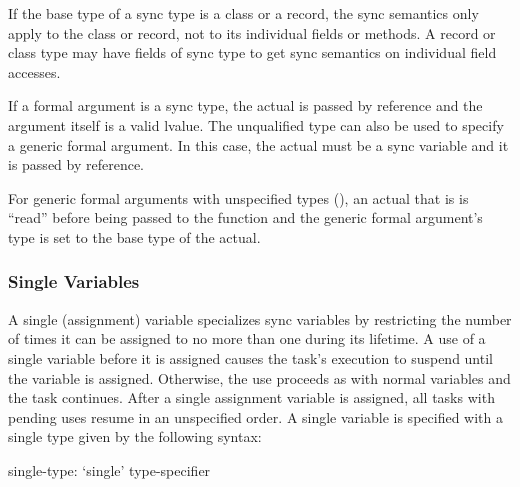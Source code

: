 If the base type of a sync type is a class or a record, the sync
semantics only apply to the class or record, not to its individual
fields or methods.  A record or class type may have fields of sync
type to get sync semantics on individual field accesses.

If a formal argument is a sync type, the actual is passed by reference
and the argument itself is a valid lvalue.  The unqualified
type  can also be used to specify a generic formal
argument.  In this case, the actual must be a sync variable and it is
passed by reference.

For generic formal arguments with unspecified types
(), an actual that
is  is ``read'' before being passed to the function and the
generic formal argument's type is set to the base type of the actual.

\subsubsection{Single Variables}
\label{Single_Variables}

A single (assignment) variable specializes sync variables by
restricting the number of times it can be assigned to no more than one
during its lifetime.  A use of a single variable before it is assigned
causes the task's execution to suspend until the variable is assigned.
Otherwise, the use proceeds as with normal variables and the task
continues.  After a single assignment variable is assigned, all tasks
with pending uses resume in an unspecified order.  A single variable
is specified with a single type given by the following syntax:
\begin{syntax}
single-type:
  `single' type-specifier
\end{syntax}

